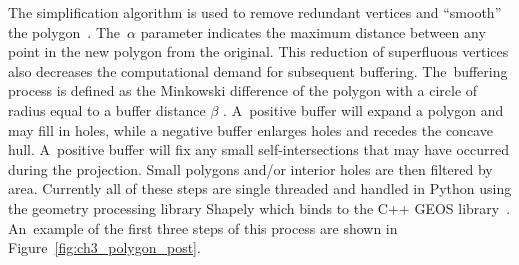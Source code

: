 The simplification algorithm is used to remove redundant vertices and ``smooth'' the polygon~\cite{douglas_algorithms_1973}. The~$\alpha$ parameter indicates the maximum distance between any point in the new polygon from the original. This reduction of superfluous vertices also decreases the computational demand for subsequent buffering. The~buffering process is defined as the Minkowski difference of the polygon with a circle of radius equal to a buffer distance $\beta$ \cite{agarwal2002polygon}. A~positive buffer will expand a polygon and may fill in holes, while a negative buffer enlarges holes and recedes the concave hull.  A~positive buffer will fix any small self-intersections that may have occurred during the projection. Small polygons and/or interior holes are then filtered by area. Currently all of these steps are single threaded and handled in Python using the geometry processing library Shapely which binds to the C++ GEOS library~\cite{gillies_github_2020}. An~example of the first three steps of this process are shown in Figure~\ref{fig:ch3_polygon_post}.


